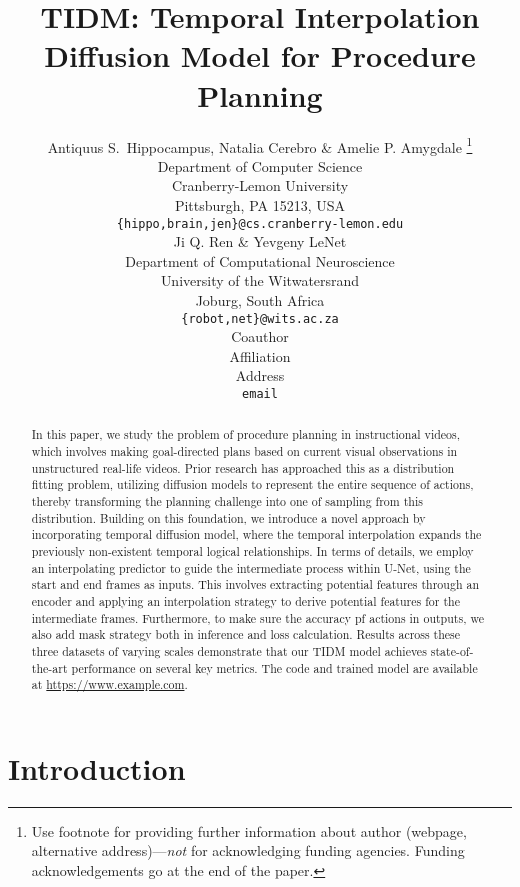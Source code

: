 \documentclass{article} %
\title{TIDM: Temporal Interpolation Diffusion Model for Procedure Planning}
\author{Antiquus S.~Hippocampus, Natalia Cerebro \& Amelie P. Amygdale \thanks{ Use footnote for providing further information
about author (webpage, alternative address)---\emph{not} for acknowledging
funding agencies.  Funding acknowledgements go at the end of the paper.} \\
Department of Computer Science\\
Cranberry-Lemon University\\
Pittsburgh, PA 15213, USA \\
\texttt{\{hippo,brain,jen\}@cs.cranberry-lemon.edu} \\
\And
Ji Q. Ren \& Yevgeny LeNet \\
Department of Computational Neuroscience \\
University of the Witwatersrand \\
Joburg, South Africa \\
\texttt{\{robot,net\}@wits.ac.za} \\
\AND
Coauthor \\
Affiliation \\
Address \\
\texttt{email}
}
\begin{document}
\maketitle
\begin{abstract}
     In this paper, we study the problem of procedure planning in instructional videos, which involves making goal-directed plans based on current visual observations in unstructured real-life videos.
     Prior research has approached this as a distribution fitting problem, utilizing diffusion models to represent the entire sequence of actions, thereby transforming the planning challenge into one of sampling from this distribution.
     Building on this foundation, we introduce a novel approach by incorporating temporal diffusion model, where the temporal interpolation expands the previously non-existent temporal logical relationships.
     In terms of details, we employ an interpolating predictor to guide the intermediate process within U-Net, using the start and end frames as inputs.
     This involves extracting potential features through an encoder and applying an interpolation strategy to derive potential features for the intermediate frames.
     Furthermore, to make sure the accuracy pf actions in outputs, we also add mask strategy both in inference and loss calculation.
     Results across these three datasets of varying scales demonstrate that our TIDM model achieves state-of-the-art performance on several key metrics.
     The code and trained model are available at \href{https://www.example.com}{https://www.example.com}.
\end{abstract}

\section{Introduction}

\end{document}
